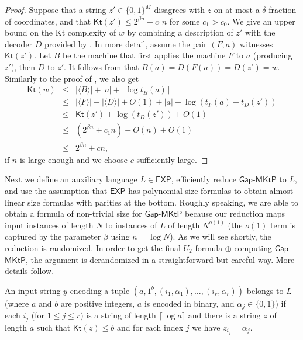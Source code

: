 \documentclass{toc}
\newcommand{\gapmktp}{\mathsf{Gap}$-$\mathsf{MKtP}}
\newcommand{\Kt}{\mathsf{Kt}}
\begin{document}
\begin{proof}
  Suppose that a string $z' \in \{0,1\}^M$ disagrees with $z$ on at most a $\delta$-fraction of coordinates, and that $\Kt(z') \leq 2^{\beta n} + c_1 n$ for some $c_1 > c_0$. %
We give an upper bound on %
the Kt complexity of $w$ by combining a description of $z'$ with the decoder $D$ provided by . In more detail, assume the pair $(F,a)$ witnesses $\Kt(z')$. Let $B$ be the machine that first applies the machine $F$ to $a$ (producing $z'$), then $D$ to $z'$. It follows from  that $B(a) = D(F(a)) = D(z') = w$. Similarly to the proof of , we also get
\begin{eqnarray}
\Kt(w) & \leq & |\langle B \rangle | + |a| + \lceil \log t_B(a) \rceil \nonumber \\
& \leq & |\langle F \rangle | + |\langle D \rangle | + O(1) + |a| + \log (t_F(a) + t_D(z')) \nonumber \\
& \leq & \Kt(z') + \log (t_D(z')) + O(1) \nonumber \\
& \leq & (2^{\beta n} + c_1 n) + O(n) + O(1) \nonumber \\
& \leq & 2^{\beta n} + cn, \nonumber 
\end{eqnarray}
if $n$ is large enough and we choose $c$ sufficiently large.
\end{proof}


Next we define an auxiliary language $L \in \mathsf{EXP}$, efficiently reduce $\gapmktp$ to $L$, and use the assumption that $\mathsf{EXP}$ has polynomial size formulas to obtain almost-linear size formulas with parities at the bottom. Roughly speaking, we are able to obtain a formula of non-trivial size for $\gapmktp$ because our reduction maps input instances of length $N$ to instances of $L$ of length $N^{o(1)}$ (the $o(1)$ term is captured by the parameter $\beta$ using $n = \log N$). As we will see shortly, the reduction is randomized. In order to get the final $U_2$-formula-$\oplus$ computing $\gapmktp$, the argument is derandomized in a straightforward but careful way. More details follow.
 

An input string $y$ encoding a tuple $(a, 1^b, (i_1, \alpha_1), \ldots, (i_r, \alpha_r))$ belongs to $L$ (where $a$ and $b$ are positive integers, $a$ is encoded in binary, and $\alpha_j \in \{0,1\}$) if each $i_{j}$ (for $1 \leq j \leq r$) is a string of length $\lceil \log a \rceil$ and there is a string $z$ of length $a$ such that $\Kt(z) \leq b$ and for each index $j$ we have $z_{i_j} = \alpha_j$. 
\end{document}
